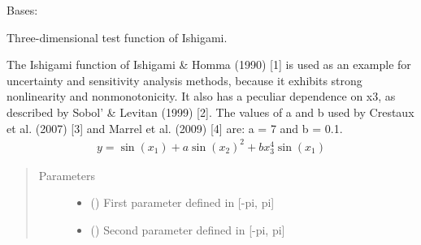 \documentclass[letterpaper,10pt,english,openany,oneside]{sphinxmanual}
\begin{document}

\begin{fulllineitems}
\label{\detokenize{pygpc.testfunctions:pygpc.testfunctions.testfunctions.Ishigami}}
Bases: {\hyperref[\detokenize{pygpc:pygpc.AbstractModel.AbstractModel}]{}}

Three-dimensional test function of Ishigami.

The Ishigami function of Ishigami \& Homma (1990) {[}1{]} is used as an example
for uncertainty and sensitivity analysis methods, because it exhibits
strong nonlinearity and nonmonotonicity. It also has a peculiar
dependence on x3, as described by Sobol’ \& Levitan (1999) {[}2{]}.
The values of a and b used by Crestaux et al. (2007) {[}3{]} and Marrel et al. (2009) {[}4{]} are: a = 7 and b = 0.1.
\begin{equation*}
\begin{split}y = \sin(x_1) + a \sin(x_2)^2 + b x_3^4 \sin(x_1)\end{split}
\end{equation*}\begin{quote}\begin{description}
\item[{Parameters}] \leavevmode\begin{itemize}
\item {} 
\sphinxstyleliteralstrong{\sphinxupquote{{[}}}\sphinxstyleliteralstrong{\sphinxupquote{{]}}} (\sphinxstyleliteralemphasis{\sphinxupquote{ {[}}}\sphinxstyleliteralemphasis{\sphinxupquote{{]}}}) \textendash{} First parameter defined in {[}-pi, pi{]}

\item {} 
\sphinxstyleliteralstrong{\sphinxupquote{{[}}}\sphinxstyleliteralstrong{\sphinxupquote{{]}}} (\sphinxstyleliteralemphasis{\sphinxupquote{ {[}}}\sphinxstyleliteralemphasis{\sphinxupquote{{]}}}) \textendash{} Second parameter defined in {[}-pi, pi{]}


\end{itemize}
\end{description}
\end{quote}
\end{fulllineitems}
\end{document}
